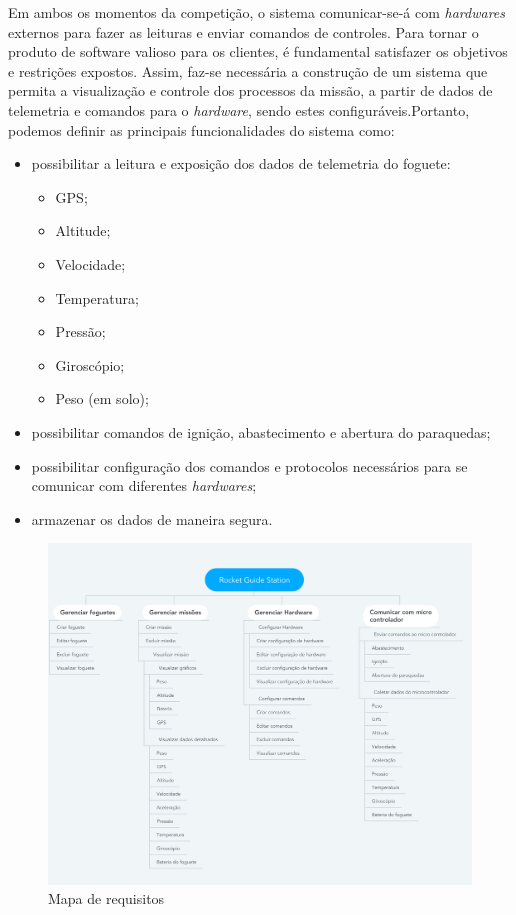 Em ambos os momentos da competição, o sistema comunicar-se-á com \textit{hardwares} externos para fazer as leituras e enviar comandos de controles. 
Para tornar o produto de software valioso para os clientes, é fundamental satisfazer os objetivos e restrições expostos. Assim, faz-se necessária a construção de um sistema que permita a visualização e controle dos processos da missão, a partir de dados de telemetria e comandos para o \textit{hardware}, sendo estes configuráveis.Portanto, podemos definir as principais funcionalidades do sistema como:
\begin{itemize}
    \item possibilitar a leitura e exposição dos dados de telemetria do foguete:
    \begin{itemize}
        \item GPS;
        \item Altitude;
        \item Velocidade;
        \item Temperatura;
        \item Pressão;
        \item Giroscópio;
        \item Peso (em solo); 
    \end{itemize}
    \item possibilitar comandos de ignição, abastecimento e abertura do paraquedas;
    \item possibilitar configuração dos comandos e protocolos necessários para se comunicar com diferentes \textit{hardwares};
    \item armazenar os dados de maneira segura.
\end{itemize}


\begin{figure}[h!]
\centering
\includegraphics[scale=0.15]{figuras/Rocket_Guide_Station.png}  
\caption{Mapa de requisitos}
\label{fig:Mindmeister}
\end{figure}

